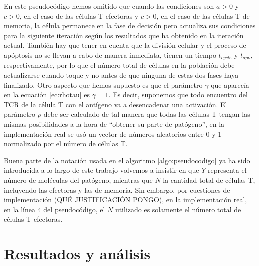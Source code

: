 En este pseudocódigo hemos omitido que cuando las condiciones son $a > 0$ y $c > 0$, en el caso de las células T efectoras y $c > 0$, en el caso de las células T de memoria, la célula permanece en la fase de decisión pero actualiza sus condiciones para la siguiente iteración según los resultados que ha obtenido en la iteración actual. También hay que tener en cuenta que la división celular y el proceso de apóptosis no se llevan a cabo de manera inmediata, tienen un tiempo $t_{cycle}$ y $t_{apo}$, respectivamente, por lo que el número total de células en la población debe actualizarse cuando toque y no antes de que ninguna de estas dos fases haya finalizado. Otro aspecto que hemos supuesto es que el parámetro $\gamma$ que aparecía en la ecuación \ref{ec:rhotau} es $\gamma = 1$. Es decir, suponemos que todo encuentro del TCR de la célula T con el antígeno va a desencadenar una activación. El parámetro $\rho$ debe ser calculado de tal manera que todas las células T tengan las mismas posibilidades a la hora de ``obtener su parte de patógeno'', en la implementación real se usó un vector de números aleatorios entre 0 y 1 normalizado por el número de células T.

Buena parte de la notación usada en el algoritmo \ref{algo:pseudocodigo} ya ha sido introducida a lo largo de este trabajo volvemos a insistir en que $Y$ representa el número de moléculas del patógeno, mientras que $N$ la cantidad total de células T, incluyendo las efectoras y las de memoria. Sin embargo, por cuestiones de implementación (QUÉ JUSTIFICACIÓN PONGO), en la implementación real, en la línea 4 del pseudocódigo, el $N$ utilizado es solamente el número total de células T efectoras.

\section{Resultados y análisis}


